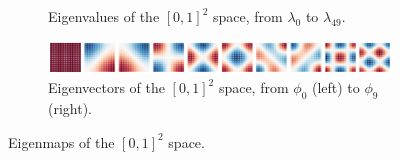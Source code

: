 \documentclass{article}
\begin{document}
\begin{figure}[h!] 
    \centering
    \begin{subfigure}[b]{0.9\textwidth}
        \centering
        \caption{Eigenvalues of the $[0,1]^2$ space, from $\lambda_0$ to $\lambda_{49}$.}
    \end{subfigure}
    \hfill
    \begin{subfigure}[b]{\textwidth}
        \centering
        \includegraphics[width=\textwidth]{Images/r2_eigenvecs.png}
        \caption{Eigenvectors of the $[0,1]^2$ space, from $\phi_0$ (left) to $\phi_9$ (right).}
    \end{subfigure}
    \caption{Eigenmaps of the $[0,1]^2$ space.}
    \label{fig:r2_eigenmaps}
\end{figure}
\end{document}
